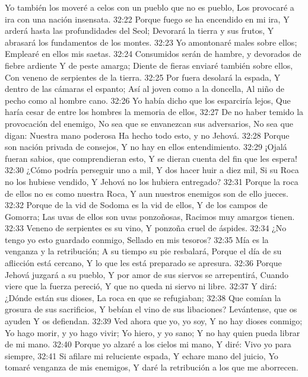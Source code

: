 Yo también los moveré a celos con un pueblo que no es pueblo,  
Los provocaré a ira con una nación insensata. 
32:22 Porque fuego se ha encendido en mi ira,  
Y arderá hasta las profundidades del Seol;  
Devorará la tierra y sus frutos,  
Y abrasará los fundamentos de los montes.  
32:23 Yo amontonaré males sobre ellos;  
Emplearé en ellos mis saetas.  
32:24 Consumidos serán de hambre, y devorados de fiebre ardiente  
Y de peste amarga;  
Diente de fieras enviaré también sobre ellos,  
Con veneno de serpientes de la tierra.  
32:25 Por fuera desolará la espada,  
Y dentro de las cámaras el espanto;  
Así al joven como a la doncella,  
Al niño de pecho como al hombre cano.  
32:26 Yo había dicho que los esparciría lejos,  
Que haría cesar de entre los hombres la memoria de ellos,  
32:27 De no haber temido la provocación del enemigo,  
No sea que se envanezcan sus adversarios,  
No sea que digan: Nuestra mano poderosa  
Ha hecho todo esto, y no Jehová.  
32:28 Porque son nación privada de consejos,  
Y no hay en ellos entendimiento.  
32:29 ¡Ojalá fueran sabios, que comprendieran esto,  
Y se dieran cuenta del fin que les espera!  
32:30 ¿Cómo podría perseguir uno a mil,  
Y dos hacer huir a diez mil,  
Si su Roca no los hubiese vendido,  
Y Jehová no los hubiera entregado? 
32:31 Porque la roca de ellos no es como nuestra Roca,  
Y aun nuestros enemigos son de ello jueces.  
32:32 Porque de la vid de Sodoma es la vid de ellos,  
Y de los campos de Gomorra;  
Las uvas de ellos son uvas ponzoñosas,  
Racimos muy amargos tienen.  
32:33 Veneno de serpientes es su vino,  
Y ponzoña cruel de áspides.  
32:34 ¿No tengo yo esto guardado conmigo,  
Sellado en mis tesoros?  
32:35 Mía es la venganza y la retribución;  
A su tiempo su pie resbalará,  
Porque el día de su aflicción está cercano,  
Y lo que les está preparado se apresura.  
32:36 Porque Jehová juzgará a su pueblo,  
Y por amor de sus siervos se arrepentirá, 
Cuando viere que la fuerza pereció,  
Y que no queda ni siervo ni libre.  
32:37 Y dirá: ¿Dónde están sus dioses,  
La roca en que se refugiaban;  
32:38 Que comían la grosura de sus sacrificios,  
Y bebían el vino de sus libaciones?  
Levántense, que os ayuden  
Y os defiendan.  
32:39 Ved ahora que yo, yo soy,  
Y no hay dioses conmigo;  
Yo hago morir, y yo hago vivir;  
Yo hiero, y yo sano;  
Y no hay quien pueda librar de mi mano.  
32:40 Porque yo alzaré a los cielos mi mano,  
Y diré: Vivo yo para siempre,  
32:41 Si afilare mi reluciente espada,  
Y echare mano del juicio,  
Yo tomaré venganza de mis enemigos,  
Y daré la retribución a los que me aborrecen. 
